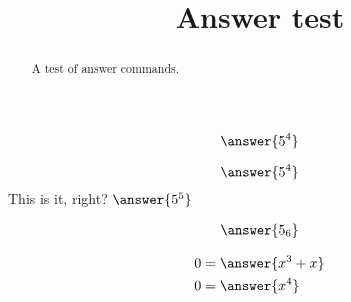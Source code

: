 \documentclass[web]{ximera}
\title{Answer test}
\begin{document}
\begin{abstract}
  A test of answer commands.
\end{abstract}
\maketitle
\[
\answer{5^4}
\]

$$
\answer{5^4}
$$
This is it, right? $\answer{5^5}$

\begin{gather}
  \answer{5_6}
\end{gather}


\begin{align*}
  0&= \answer{x^3 + x}\\
  0&= \answer{x^4}
\end{align*}



\end{document}
